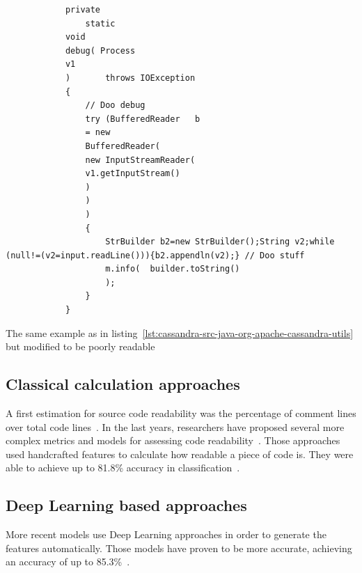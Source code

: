 \documentclass[%
class=scrreprt,
chapterprefix=false,%
open=right,%
twoside=false,%
paper=a4,%
logofile={Logo\_zentral\_farbig\_EN.png},%
thesistype=master,%
UKenglish,%
]{se2thesis}
\begin{document}
	\begin{listing}[!ht]
		\begin{verbatim}
			private 
				static 
			void 
			debug( Process 
			v1 
			)       throws IOException
			{
				// Doo debug
				try (BufferedReader   b 
				= new 
				BufferedReader(
				new InputStreamReader(
				v1.getInputStream()
				)
				)
				)
				{
					StrBuilder b2=new StrBuilder();String v2;while (null!=(v2=input.readLine())){b2.appendln(v2);} // Doo stuff
					m.info(  builder.toString()
					);
				}
			}
		\end{verbatim}
		\caption{The same example as in listing~\ref{lst:cassandra-src-java-org-apache-cassandra-utils} but modified to be poorly readable}
		\label{lst:cassandra-src-java-org-apache-cassandra-utils-modified}
	\end{listing}
	
%	
%	
%	
	
	\subsection{Classical calculation approaches} \label{Classical calculation approaches}
	A first estimation for source code readability was the percentage of comment lines over total code lines~\cite{aggarwal2002integrated}. In the last years, researchers have proposed several more complex metrics and models for assessing code readability~\cite{buse2009learning, posnett2011simpler, dorn2012general, scalabrino2018comprehensive}.
	Those approaches used handcrafted features to calculate how readable a piece of code is. They were able to achieve up to 81.8\% accuracy in classification~\cite{scalabrino2018comprehensive}.
	
	\subsection{Deep Learning based approaches} \label{(Deep) Learning based approaches}
	More recent models use Deep Learning approaches in order to generate the features automatically. Those models have proven to be more accurate, achieving an accuracy of up to 85.3\%~\cite{mi2018improving, mi2022towards}.
	
\end{document}
